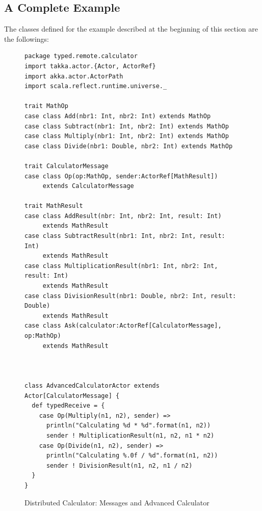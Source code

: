 \subsection{A Complete Example}

The classes defined for the example described at the beginning of this section 
are the followings:


\begin{figure}[p]
\begin{lstlisting}
package typed.remote.calculator
import takka.actor.{Actor, ActorRef}
import akka.actor.ActorPath
import scala.reflect.runtime.universe._

trait MathOp
case class Add(nbr1: Int, nbr2: Int) extends MathOp
case class Subtract(nbr1: Int, nbr2: Int) extends MathOp
case class Multiply(nbr1: Int, nbr2: Int) extends MathOp
case class Divide(nbr1: Double, nbr2: Int) extends MathOp

trait CalculatorMessage
case class Op(op:MathOp, sender:ActorRef[MathResult])                    
     extends CalculatorMessage
     
trait MathResult
case class AddResult(nbr: Int, nbr2: Int, result: Int)                   
     extends MathResult
case class SubtractResult(nbr1: Int, nbr2: Int, result: Int)                    
     extends MathResult
case class MultiplicationResult(nbr1: Int, nbr2: Int, result: Int)       
     extends MathResult
case class DivisionResult(nbr1: Double, nbr2: Int, result: Double)       
     extends MathResult
case class Ask(calculator:ActorRef[CalculatorMessage], op:MathOp) 
     extends MathResult
     


class AdvancedCalculatorActor extends Actor[CalculatorMessage] {
  def typedReceive = {
    case Op(Multiply(n1, n2), sender) =>
      println("Calculating %d * %d".format(n1, n2))
      sender ! MultiplicationResult(n1, n2, n1 * n2)
    case Op(Divide(n1, n2), sender) =>
      println("Calculating %.0f / %d".format(n1, n2))
      sender ! DivisionResult(n1, n2, n1 / n2)
  }
}
\end{lstlisting}
\caption{Distributed Calculator: Messages and Advanced Calculator}
\label{discal_message}
\end{figure}

